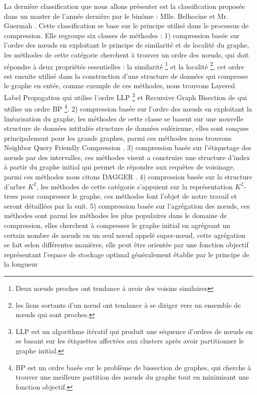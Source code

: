 La dernière classification que nous allons présenter est la classification proposée dans un master de l'année dernière par le binôme : Mlle. Belhocine et Mr. Guermah \citep{master2017}. Cette classification se base sur le principe utilisé dans le processus de compression. Elle regroupe six classes de méthodes : 1) compression basée sur l'ordre des nœuds en exploitant le principe de similarité et de localité du graphe, les méthodes de cette catégorie cherchent à trouver un ordre des nœuds, qui doit répondre à deux propriétés essentielles : la similarité \footnote{ Deux nœuds proches ont tendance à avoir des voisins similaires} et la localité \footnote{ les liens sortants d'un nœud ont tendance à se diriger vers un ensemble
de nœuds qui sont proches.}, cet ordre est ensuite utilisé dans la construction d'une structure de données qui compresse le graphe en entée, comme exemple de ces méthodes, nous trouvons Layered Label Propagation \citep{boldi2011layered} qui utilise l'ordre LLP \footnote{LLP est un algorithme itératif qui produit une séquence d’ordres de nœuds en se basant sur les étiquettes affectées aux clusters après avoir partitionner le graphe initial.} et Recursive Graph Bisection de \citep{dhulipala2016compressing} qui utilise un ordre BP \footnote{BP est un ordre basée sur le problème de bissection de graphes, qui cherche à trouver une meilleure partition des nœuds du graphe tout en minimisant une fonction objectif.}. 2) compression basée sur l'ordre des nœuds en exploitant la linéarisation du graphe, les méthodes de cette classe se basent sur une nouvelle structure de données intitulée structure de données eulérienne, elles sont conçues principalement pour les grands graphes, parmi ces méthodes nous trouvons Neighbor Query Friendly Compression 
\citep{maserrat2012community}. 3) compression basée sur l'étiquetage des nœuds par des intervalles, ces méthodes visent a construire une structure d'index à partir du graphe initial qui permet de répondre aux requêtes de voisinage, parmi ces méthodes nous citons DAGGER \citep{yildirim2012grail}. 4) compression basée sur la structure d'arbre ${K}^{2}$, les méthodes de cette catégorie s'appuient sur la représentation ${K}^{2}$-trees pour compresser le graphe, ces méthodes font l'objet de notre travail et seront détaillées par la suit. 5) compression basée sur l'agrégation des nœuds, ces méthodes sont parmi les méthodes les plus populaires dans le domaine de compression, elles cherchent à compresser le graphe initial en agrégeant un certain nombre de nœuds en un seul nœud appelé super-nœud, cette agrégation se fait selon différentes manières, elle peut être orientée par une fonction objectif représentant l’espace de stockage optimal généralement établie par le principe de la longueur
